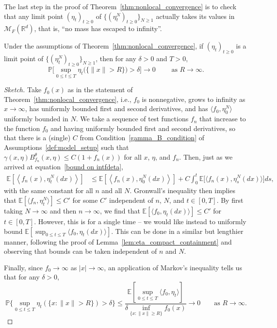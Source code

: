 \documentclass[EJP]{ejpecp} %
\newcommand{\IP}{\mathbb P}
\newcommand{\IE}{\mathbb E}
\newcommand{\IR}{\mathbb R}
\newcommand{\measures}{\mathcal{M}_F(\IR^d)} %
\begin{document}
The last step in the proof of Theorem~\ref{thm:nonlocal_convergence}
is to check that
any limit point $(\eta_t)_{t\geq 0}$ of $\{(\eta^N_t)_{t\geq 0}\}_{N\geq 1}$
actually takes its values in $\measures$, that is, ``no mass has escaped to infinity''.

\begin{lemma}
\label{no mass at infty}
Under the assumptions of Theorem~\ref{thm:nonlocal_convergence},
if $(\eta_t)_{t\geq 0}$ is a limit point of $\{(\eta^N_t)_{t\geq 0}\}_{N\geq 1}$,
then for any $\delta>0$ and $T>0$,
\[
\IP\bigg[
    \sup_{0 \le t \le T} \eta_t\big(\{\|x\|>R\}\big)>\delta
\bigg]\to 0\qquad\mbox{ as }R\to\infty.
\]
\end{lemma}

\begin{proof}[Sketch]
Take $f_0(x)$ as in the statement of Theorem~\ref{thm:nonlocal_convergence},
i.e., $f_0$ is nonnegative, grows to infinity as $x \to \infty$,
has uniformly bounded first and second derivatives,
and has $\langle f_0, \eta^N_0\rangle$ uniformly bounded in $N$.
We take a sequence of test functions $f_n$ that increase to the function $f_0$
and having uniformly bounded first and second derivatives,
so that there is a (single) $C$
from Condition~\ref{gamma_B_condition} of Assumptions~\ref{def:model_setup}
such that $\gamma(x,\eta) B_{f_n}^\theta(x,\eta) \le C(1 + f_n(x))$
for all $x$, $\eta$, and $f_n$.
Then, just as we arrived at equation~\eqref{bound on intfdeta},
\begin{align*}
    \IE\left[\left\langle f_n(x), \eta^N_t(dx) \right\rangle\right]
    &\le
    \IE\left[\left\langle f_n(x), \eta^N_0(dx) \right\rangle\right]
    +
    C \int_0^t \IE\Big[\Big\langle f_n(x), \eta^N_s(dx) \Big\rangle \Big] ds ,
\end{align*}
with the same constant for all $n$ and all $N$.
Gronwall's inequality then implies that 
$\IE[\langle f_n, \eta^N_t\rangle] \le C'$
for some $C'$ independent of $n$, $N$, and $t \in [0,T]$.
By first taking $N \to \infty$ and then $n \to \infty$,
we find that $\IE[\langle f_0, \eta_t(dx)\rangle] \le C'$ for $t\in [0,T]$.
However, this is for a single time --
we would like instead to uniformly bound
$\IE[\sup_{0 \le t \le T} \langle f_0, \eta_t(dx)\rangle]$.
This can be done in a similar but lengthier manner,
following the proof of Lemma~\ref{lem:eta_compact_containment}
and observing that bounds can be taken independent of $n$ and $N$.

Finally, since $f_0 \to \infty$ as $|x| \to \infty$,
an application of Markov's inequality
tells us that for any $\delta > 0$,
$$
    \IP\bigg\{ \sup_{0 \le t \le T} \eta_t(\{x : \|x\| > R\})>\delta \bigg\}
    \le \frac{\IE[\sup_{0 \le t \le T} \langle f_0, \eta_t\rangle]}{\delta \inf_{\{x:\|x\|\ge R\}} f_0(x)}
    \to 0 \qquad \text{as } R\to\infty .
$$
\end{proof}
\end{document}

